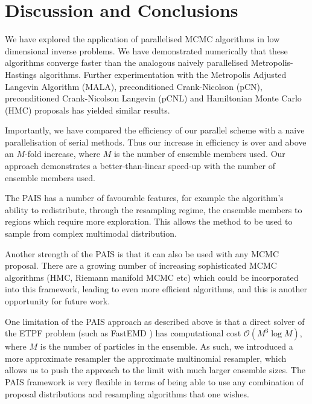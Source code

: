 \documentclass[final]{siamltex}
\begin{document}
\section{Discussion and Conclusions}\label{Sec:Conc} 

We have explored the application of parallelised MCMC algorithms in
low dimensional inverse problems. We have demonstrated numerically
that these algorithms converge faster than the analogous naively parallelised
Metropolis-Hastings algorithms. Further experimentation with the Metropolis
Adjusted Langevin Algorithm (MALA), preconditioned Crank-Nicolson (pCN),
preconditioned Crank-Nicolson Langevin (pCNL) and Hamiltonian
Monte Carlo (HMC) proposals has yielded similar results\cite{Paul}.

Importantly, we have compared the efficiency of our parallel scheme
with a naive parallelisation of serial methods. Thus our increase in
efficiency is over and above an $M$-fold increase, where $M$ is the
number of ensemble members used. Our approach
demonstrates a better-than-linear speed-up with the number of ensemble
members used. 

The PAIS has a number of favourable features, for example the
algorithm's ability to redistribute, through the resampling regime,
the ensemble members to regions which require more exploration. This allows the
method to be used to sample from complex multimodal distribution.

Another strength of the PAIS is that it can also be used with any MCMC
proposal. There are a growing number of increasing sophisticated MCMC
algorithms (HMC, Riemann manifold MCMC etc) which could be
incorporated into this framework, leading to even more efficient
algorithms, and this is another opportunity for future work. 


One limitation of the PAIS approach as described above is that a
direct solver of the ETPF problem (such as FastEMD \cite{FastEMD}) has computational cost
$\mathcal{O}(M^3\log M)$, where $M$ is the number of particles in the
ensemble. As such, we introduced a more approximate resampler the
approximate multinomial resampler, which allows us to push the
approach to the limit
with much larger ensemble sizes. The PAIS framework is very flexible
in terms of being able to use any combination of proposal
distributions and resampling algorithms that one wishes.
\end{document}
